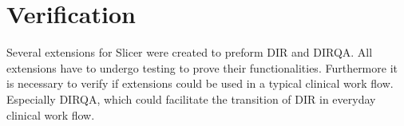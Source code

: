 % 
% 
% 
% 
% 


\newpage
\section{Verification}
\label{Verification}

Several extensions for Slicer were created to preform DIR and DIRQA. All extensions have to undergo testing to prove their functionalities. Furthermore it is necessary to verify if extensions could be used in a typical clinical work flow.
Especially DIRQA, which could facilitate the transition of DIR in everyday clinical work flow.

